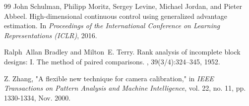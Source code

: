 \documentclass{book}
\begin{document}
\begin{thebibliography}{99}
John Schulman, Philipp Moritz, Sergey Levine, Michael Jordan, and Pieter Abbeel.
\newblock High-dimensional continuous control using generalized advantage estimation.
\newblock In {\em Proceedings of the International Conference on Learning Representations (ICLR)}, 2016.

Ralph~Allan Bradley and Milton~E. Terry.
\newblock Rank analysis of incomplete block designs: I. The method of paired comparisons.
, 39(3/4):324--345, 1952.

Z. Zhang, "A flexible new technique for camera calibration," in \textit{IEEE Transactions on Pattern Analysis and Machine Intelligence}, vol. 22, no. 11, pp. 1330-1334, Nov. 2000.

\end{thebibliography}
\end{document}
